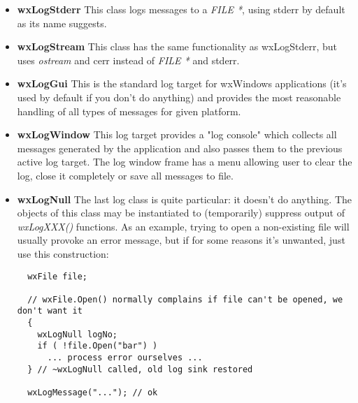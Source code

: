 \begin{itemize}\itemsep=0pt
\item{\bf wxLogStderr} This class logs messages to a {\it FILE *}, using
stderr by default as its name suggests.
\item{\bf wxLogStream} This class has the same functionality as wxLogStderr,
but uses {\it ostream} and cerr instead of {\it FILE *} and stderr.
\item{\bf wxLogGui} This is the standard log target for wxWindows
applications (it's used by default if you don't do anything) and provides the
most reasonable handling of all types of messages for given platform.
\item{\bf wxLogWindow} This log target provides a "log console" which
collects all messages generated by the application and also passes them to the
previous active log target. The log window frame has a menu allowing user to
clear the log, close it completely or save all messages to file.
\item{\bf wxLogNull} The last log class is quite particular: it doesn't do
anything. The objects of this class may be instantiated to (temporarily)
suppress output of {\it wxLogXXX()} functions. As an example, trying to open a
non-existing file will usually provoke an error message, but if for some
reasons it's unwanted, just use this construction:

{\small
\begin{verbatim}
  wxFile file;

  // wxFile.Open() normally complains if file can't be opened, we don't want it
  {
    wxLogNull logNo;
    if ( !file.Open("bar") )
      ... process error ourselves ...
  } // ~wxLogNull called, old log sink restored
  
  wxLogMessage("..."); // ok
\end{verbatim}
}
\end{itemize}

